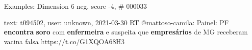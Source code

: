 \begin{frame}{Examples: Dimension 6 neg, score -4, \# 000033}
\footnotesize
\begin{alertblock}{text: t094502, user: unknown, 2021-03-30}
RT @mattoso-camila: Painel: PF \textbf{encontra} \textbf{soro} com 
\textbf{enfermeira} e suspeita que \textbf{empresários} de MG receberam vacina 
falsa https://t.co/G1XQOA68H3 
\end{alertblock}
\end{frame}
